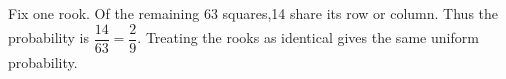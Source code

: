 Fix one rook. Of the remaining 63 squares,14 share its row or column. Thus the probability is $\dfrac{14}{63}=\boxed{\dfrac{2}{9}}$. Treating the rooks as identical gives the same uniform probability.

